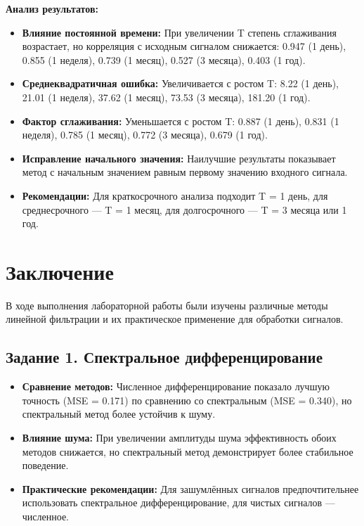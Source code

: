 \textbf{Анализ результатов:}
\begin{itemize}
    \item \textbf{Влияние постоянной времени:} При увеличении T степень сглаживания возрастает, но корреляция с исходным сигналом снижается: 0.947 (1 день), 0.855 (1 неделя), 0.739 (1 месяц), 0.527 (3 месяца), 0.403 (1 год).
    
    \item \textbf{Среднеквадратичная ошибка:} Увеличивается с ростом T: 8.22 (1 день), 21.01 (1 неделя), 37.62 (1 месяц), 73.53 (3 месяца), 181.20 (1 год).
    
    \item \textbf{Фактор сглаживания:} Уменьшается с ростом T: 0.887 (1 день), 0.831 (1 неделя), 0.785 (1 месяц), 0.772 (3 месяца), 0.679 (1 год).
    
    \item \textbf{Исправление начального значения:} Наилучшие результаты показывает метод с начальным значением равным первому значению входного сигнала.
    
    \item \textbf{Рекомендации:} Для краткосрочного анализа подходит T = 1 день, для среднесрочного — T = 1 месяц, для долгосрочного — T = 3 месяца или 1 год.
\end{itemize}

\section*{Заключение}

В ходе выполнения лабораторной работы были изучены различные методы линейной фильтрации и их практическое применение для обработки сигналов.

\subsection*{Задание 1. Спектральное дифференцирование}
\begin{itemize}
    \item \textbf{Сравнение методов:} Численное дифференцирование показало лучшую точность (MSE = 0.171) по сравнению со спектральным (MSE = 0.340), но спектральный метод более устойчив к шуму.
    
    \item \textbf{Влияние шума:} При увеличении амплитуды шума эффективность обоих методов снижается, но спектральный метод демонстрирует более стабильное поведение.
    
    \item \textbf{Практические рекомендации:} Для зашумлённых сигналов предпочтительнее использовать спектральное дифференцирование, для чистых сигналов — численное.
\end{itemize}

